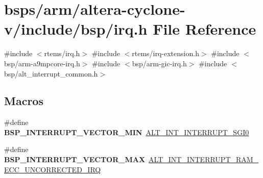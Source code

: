 \hypertarget{bsps_2arm_2altera-cyclone-v_2include_2bsp_2irq_8h}{}\section{bsps/arm/altera-\/cyclone-\/v/include/bsp/irq.h File Reference}
\label{bsps_2arm_2altera-cyclone-v_2include_2bsp_2irq_8h}
{\ttfamily \#include $<$rtems/irq.\+h$>$}\newline
{\ttfamily \#include $<$rtems/irq-\/extension.\+h$>$}\newline
{\ttfamily \#include $<$bsp/arm-\/a9mpcore-\/irq.\+h$>$}\newline
{\ttfamily \#include $<$bsp/arm-\/gic-\/irq.\+h$>$}\newline
{\ttfamily \#include $<$bsp/alt\+\_\+interrupt\+\_\+common.\+h$>$}\newline
\subsection*{Macros}
\begin{DoxyCompactItemize}
\item 
\#define {\bfseries B\+S\+P\+\_\+\+I\+N\+T\+E\+R\+R\+U\+P\+T\+\_\+\+V\+E\+C\+T\+O\+R\+\_\+\+M\+IN}~\mbox{\hyperlink{group__INT__COMMON_ggaf87a5a7f416fc6f679b59dadacbeb592a8057a3e1fb67a8ba98a4e589a391d611}{A\+L\+T\+\_\+\+I\+N\+T\+\_\+\+I\+N\+T\+E\+R\+R\+U\+P\+T\+\_\+\+S\+G\+I0}}
\item 
\#define {\bfseries B\+S\+P\+\_\+\+I\+N\+T\+E\+R\+R\+U\+P\+T\+\_\+\+V\+E\+C\+T\+O\+R\+\_\+\+M\+AX}~\mbox{\hyperlink{group__INT__COMMON_ggaf87a5a7f416fc6f679b59dadacbeb592afc1e4bc340fd07bd7085f144a672b291}{A\+L\+T\+\_\+\+I\+N\+T\+\_\+\+I\+N\+T\+E\+R\+R\+U\+P\+T\+\_\+\+R\+A\+M\+\_\+\+E\+C\+C\+\_\+\+U\+N\+C\+O\+R\+R\+E\+C\+T\+E\+D\+\_\+\+I\+RQ}}
\end{DoxyCompactItemize}
